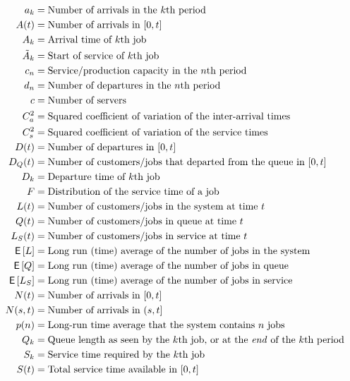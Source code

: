 \begin{align*}
 a_k &= \text{Number of arrivals in the $k$th period} \\
 A(t) &= \text{Number of arrivals in $[0,t]$} \\
 A_k &= \text{Arrival time of $k$th job} \\
 \tilde A_{k} &= \text{Start of service of $k$th job} \\
 c_n &= \text{Service/production capacity in the $n$th period} \\
 d_n &= \text{Number of departures in the $n$th period} \\
 c &= \text{Number of servers} \\
 C_a^2 &= \text{Squared coefficient of variation of the inter-arrival times} \\
 C_s^2 &= \text{Squared coefficient of variation of the service times} \\
 D(t) &= \text{Number of departures in $[0,t]$} \\
 D_Q(t) &= \text{Number of customers/jobs that departed from the queue in $[0,t]$} \\
 D_k &= \text{Departure time of $k$th job} \\
 F &= \text{Distribution of the service time of a job} \\
 L(t) &= \text{Number of customers/jobs in the system at time $t$} \\
 Q(t) &= \text{Number of customers/jobs in queue at time $t$} \\
 L_S(t) &= \text{Number of customers/jobs in service at time $t$} \\
 \E L &= \text{Long run (time) average of the number of jobs in the system} \\
 \E Q &= \text{Long run (time) average of the number of jobs in queue} \\
 \E{L_S} &= \text{Long run (time) average of the number of jobs in service} \\
 N(t) &= \text{Number of arrivals in $[0,t]$} \\
 N(s,t) &= \text{Number of arrivals in $(s,t]$} \\
 p(n) &= \text{Long-run time average that the system contains $n$ jobs} \\
 Q_k &= \text{Queue length as seen by the $k$th job, or at the \textit{end} of the $k$th period} \\
 S_k &= \text{Service time required by the $k$th job} \\
 S(t) &= \text{Total service time available in $[0,t]$} \\

\end{align*}
